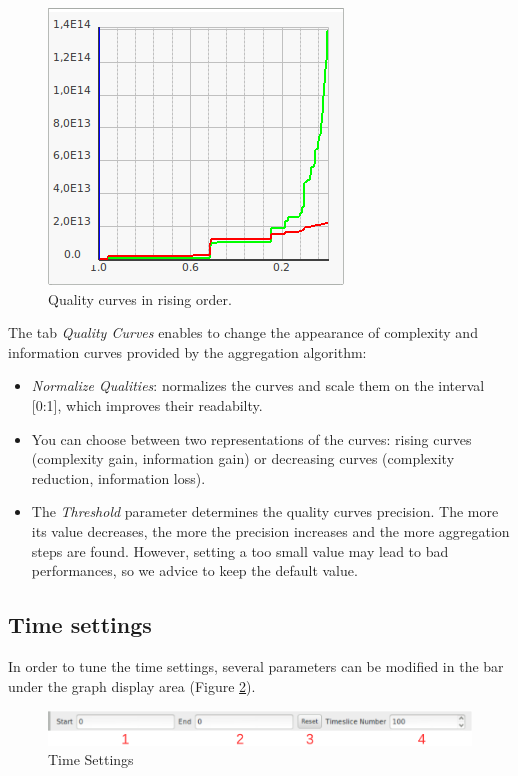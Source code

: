 \documentclass[twoside]{article}
\begin{document}
\begin{sloppypar}
\begin{figure}[h!]
	\centering
	\includegraphics[scale=0.5]{images/ocelotlCurves.png}
	\caption{Quality curves in rising order.}
	\label{aggregCurves}
\end{figure}
The tab \textit{Quality Curves} enables to change the appearance of complexity and information curves provided by the aggregation algorithm:
\begin{itemize}
	\item \textit{Normalize Qualities}: normalizes the curves and scale them on the interval [0:1], which improves their readabilty.
    \item You can choose between two representations of the curves: rising curves (complexity gain, information gain) or decreasing curves (complexity reduction, information loss).
    \item The \textit{Threshold} parameter determines the quality curves precision. The more its value decreases, the more the precision increases and the more aggregation steps are found. However, setting a too small value may lead to bad performances, so we advice to keep the default value.
\end{itemize}



\subsection{Time settings}
In order to tune the time settings, several parameters can be modified in the bar under the graph display area (Figure \ref{timeSettings}).
 
\begin{figure}[h!]
	\centering
	\includegraphics[width=1.0\textwidth]{images/ocelotl_bottom_time.pdf}
	\caption{Time Settings}
	\label{timeSettings}
\end{figure}


\end{sloppypar}
\end{document}
